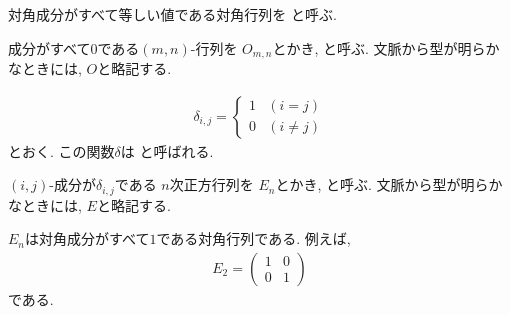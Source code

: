 \begin{definition}
  \label{def:mat:scalar}
  対角成分がすべて等しい値である対角行列を
  と呼ぶ.
\end{definition}
\begin{definition}
  \label{def:mat:zero}
  成分がすべて$0$である$(m,n)$-行列を
  $O_{m,n}$とかき,
  と呼ぶ.
  文脈から型が明らかなときには,
  $O$と略記する.
\end{definition}
\begin{definition}
  \label{def:ksdelta}
  \begin{align*}
    \delta_{i,j}=
    \begin{cases}
      1&(i=j)\\
      0&(i\neq j)
    \end{cases}
  \end{align*}
  とおく.  この関数$\delta$は
  と呼ばれる.
\end{definition}

\begin{definition}
  \label{def:mat:unit}
  $(i,j)$-成分が$\delta_{i,j}$である
  $n$次正方行列を
  $E_{n}$とかき,
  と呼ぶ.
  文脈から型が明らかなときには,
  $E$と略記する.
\end{definition}

\begin{example}
  $E_n$は対角成分がすべて$1$である対角行列である.
  例えば,
  \begin{align*}
    E_2=
    \begin{pmatrix}
      1&0\\
      0&1
    \end{pmatrix}
  \end{align*}
  である.
\end{example}


